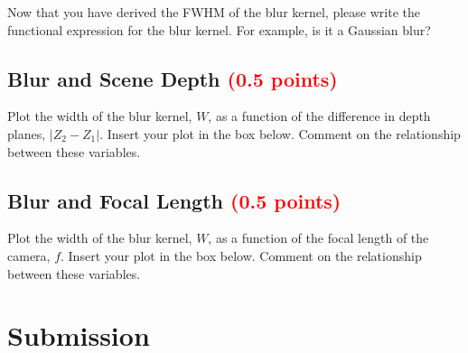 \documentclass[answers]{exam}
\newcommand{\mypoints}[1]{\textcolor{red}{(#1 points)}}
\newcommand{\myinput}[1]{\textcolor{blue}{#1}}
\begin{document}
Now that you have derived the FWHM of the blur kernel, please write the functional expression for the blur kernel. For example, is it a Gaussian blur?
    \begin{solution}
    \vspace{3cm} %
   \myinput{} 
    \end{solution}
    
\subsection{Blur and Scene Depth \mypoints{0.5}} \label{sssec:scenedepth}

Plot the width of the blur kernel, $W$, as a function of the difference in depth planes, $\lvert Z_2 - Z_1 \rvert$. Insert your plot in the box below. Comment on the relationship between these variables. 
    \begin{solution}
    \vspace{3cm} %
   \myinput{} 
    \end{solution}


\subsection{Blur and Focal Length \mypoints{0.5}} \label{sssec:focallength}

Plot the width of the blur kernel, $W$, as a function of the focal length of the camera, $f$. Insert your plot in the box below. Comment on the relationship between these variables.

    \begin{solution}
    \vspace{3cm} %
   \myinput{} 
    \end{solution}

\newpage

\section{Submission}
\end{document}

